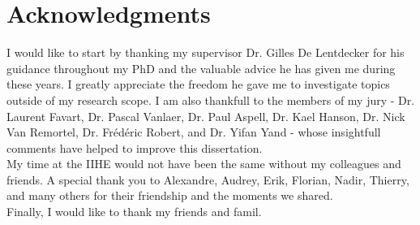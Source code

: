 \chapter*{Acknowledgments}

  I would like to start by thanking my supervisor Dr. Gilles De Lentdecker for his guidance throughout my PhD and the valuable advice he has given me during these years. I greatly appreciate the freedom he gave me to investigate topics outside of my research scope. I am also thankfull to the members of my jury - Dr. Laurent Favart, Dr. Pascal Vanlaer, Dr. Paul Aspell, Dr. Kael Hanson, Dr. Nick Van Remortel, Dr. Frédéric Robert, and Dr. Yifan Yand -  whose insightfull comments have helped to improve this dissertation. \\

  My time at the IIHE would not have been the same without my colleagues and friends. A special thank you to Alexandre, Audrey, Erik, Florian, Nadir, Thierry, and many others for their friendship and the moments we shared. \\

  Finally, I would like to thank my friends and famil. 
